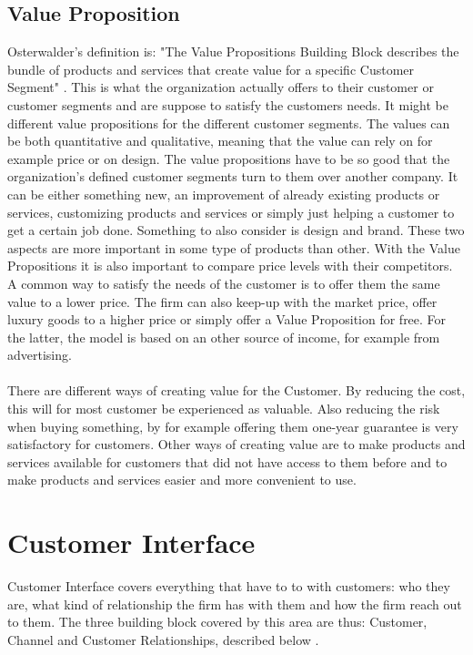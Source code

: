 \subsection{Value Proposition}
Osterwalder's definition is: "The Value Propositions Building Block describes the bundle of products and services that create value for a specific Customer Segment" \cite{osterwalder}. This is what the organization actually offers to their customer or customer segments and are suppose to satisfy the customers needs. It might be different value propositions for the different customer segments. The values can be both quantitative and qualitative, meaning that the value can rely on for example price or on design. The value propositions have to be so good that the organization's defined customer segments turn to them over another company. It can be either something new, an improvement of already existing products or services, customizing products and services or simply just helping a customer to get a certain job done. Something to also consider is design and brand. These two aspects are more important in some type of products than other. With the Value Propositions it is also important to compare price levels with their competitors. A common way to satisfy the needs of the customer is to offer them the same value to a lower price. The firm can also keep-up with the market price, offer luxury goods to a higher price or simply offer a Value Proposition for free. For the latter, the model is based on an other source of income, for example from advertising. \\ \\
There are different ways of creating value for the Customer. By reducing the cost, this will for most customer be experienced as valuable. Also reducing the risk when buying something, by for example offering them one-year guarantee is very satisfactory for customers. Other ways of creating value are to make products and services available for customers that did not have access to them before and to make products and services easier and more convenient to use.


\section{Customer Interface}
Customer Interface covers everything that have to to with customers: who they are, what kind of relationship the firm has with them and how the firm reach out to them. The three building block covered by this area are thus: Customer, Channel and Customer Relationships, described below \cite{osterwalderthesis}.

